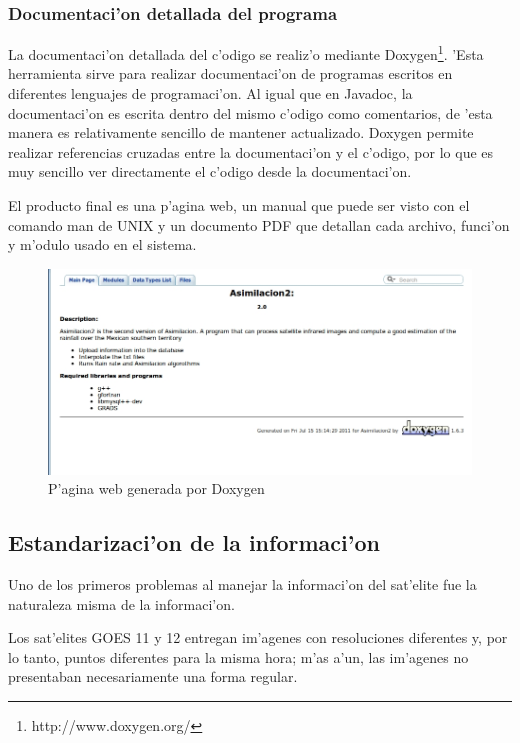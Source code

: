   \subsubsection*{Documentaci'on detallada del programa}
  La documentaci'on detallada del c'odigo se realiz'o mediante Doxygen\footnote{http://www.doxygen.org/}. 
'Esta herramienta sirve para realizar documentaci'on de programas escritos
en diferentes lenguajes de programaci'on. Al igual que en Javadoc, la documentaci'on es escrita dentro del mismo c'odigo como comentarios, de 'esta manera 
es relativamente sencillo de mantener actualizado. Doxygen permite realizar referencias cruzadas entre la documentaci'on y el c'odigo, por lo que es muy 
sencillo ver directamente el c'odigo desde la documentaci'on.

  El producto final es una p'agina web, un manual 
  que puede ser visto con el comando man de UNIX y un documento PDF que detallan cada archivo, funci'on y m'odulo usado en el sistema.
\begin{figure}[h!]
 \centering
 \includegraphics[width=150mm]{./imagenes/doxygen1.jpg}
\caption{P'agina web generada por Doxygen}
\end{figure}

\subsection{Estandarizaci'on de la informaci'on}
  Uno de los primeros problemas al manejar la informaci'on del sat'elite fue la naturaleza misma de la informaci'on. 

  Los sat'elites GOES 11 y 12 entregan im'agenes con resoluciones diferentes y, por lo tanto, puntos 
  diferentes para la misma hora; m'as a'un, las im'agenes no presentaban necesariamente una forma regular.

